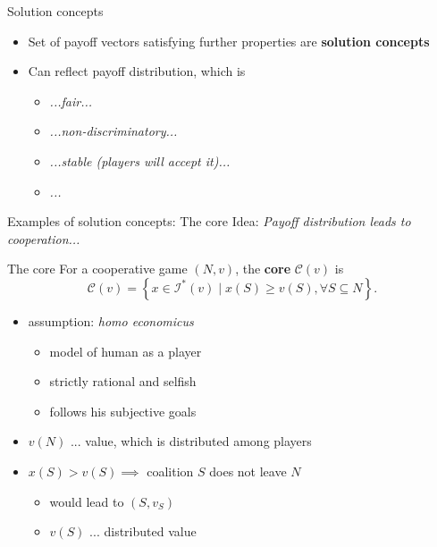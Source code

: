 \documentclass{beamer}
\newcommand{\I}{\mathcal{I}}
\begin{document}

\begin{frame}{Solution concepts}
	\begin{itemize}
	    \item<2-> Set of payoff vectors satisfying further properties are \textbf{solution concepts}
	    \item<3-> Can reflect payoff distribution, which is
	    \begin{itemize}
	        \item<4-> \textit{...fair...}
	        \item<4-> \textit{...non-discriminatory...}
	        \item<4-> \textit{...stable (players will accept it)...} 
	        \item<4-> \textit{...}
	    \end{itemize}
	\end{itemize}
\end{frame}



\begin{frame}{Examples of solution concepts: The core}
    Idea: \textit{Payoff distribution leads to cooperation...}
    \begin{block}{The core}
    For a cooperative game $(N,v)$, the \textbf{core} $\mathcal{C}(v)$ is
    \[\mathcal{C}(v) = \left\{x \in \I^*(v) \mid x(S) \geq v(S), \forall S \subseteq N \right\}.\]
    \end{block}
    \begin{itemize}
        \item<2-> assumption: \textit{homo economicus} 
        \begin{itemize}
            \item<3-> model of human as a player
            \item<3-> strictly rational and selfish
            \item<3-> follows his subjective goals
        \end{itemize}
        \item<4-> $v(N)$ ... value, which is distributed among players
            \item<5-> $x(S) > v(S) \implies$ coalition $S$ does not leave $N$ 
            \begin{itemize}
                \item<6-> would lead to $(S,v_S)$
                \item<6-> $v(S)$ ... distributed value
            \end{itemize}
    \end{itemize}
\end{frame}
\end{document}
